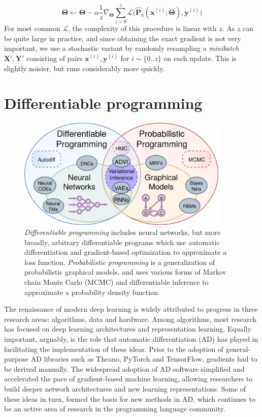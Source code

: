 \documentclass[12pt,initial,twoside,maitrise]{dms}
\numberwithin{equation}{section}
\numberwithin{table}{chapter}
\numberwithin{figure}{chapter}
\begin{document}
%
\begin{equation} \label{eq:stochastic_grad_descent}
    \mathbf\Theta \leftarrow \mathbf\Theta - \alpha\frac{1}{z}\nabla_{\mathbf\Theta} \sum_{i=0}^z\mathcal{L}\big(\mathbf{\hat P}_k(\mathbf{x}^{(i)}; \mathbf{\Theta}), \mathbf{y}^{(i)}\big)
\end{equation}
%
For most common $\mathcal{L}$, the complexity of this procedure is linear with $z$. As $z$ can be quite large in practice, and since obtaining the exact gradient is not very important, we use a stochastic variant by randomly resampling a \textit{minibatch} $\mathbf{X}', \mathbf{Y}'$ consisting of pairs $\mathbf{x}^{(i)}, \mathbf{y}^{(i)}$ for $i \sim \{0..z\}$ on each update. This is slightly noisier, but runs considerably more quickly.

\section{Differentiable programming}\label{sec:differentiable-programming}

\begin{figure}
    \centering
    \includegraphics[width=0.90\textwidth]{diff_prob_prog.png}
    \caption{\textit{Differentiable programming} includes neural networks, but more broadly, arbitrary differentiable programs which use automatic differentiation and gradient-based optimization to approximate a loss function. \textit{Probabilistic programming} is a generalization of probabilistic graphical models, and uses various forms of Markov chain Monte Carlo (MCMC) and differentiable inference to approximate a probability density function.}
    \label{fig:diff_prob_prog}
\end{figure}

The renaissance of modern deep learning is widely attributed to progress in three research areas: algorithms, data and hardware. Among algorithms, most research has focused on deep learning architectures and representation learning. Equally important, arguably, is the role that automatic differentiation (AD) has played in facilitating the implementation of these ideas. Prior to the adoption of general-purpose AD libraries such as Theano, PyTorch and TensorFlow, gradients had to be derived manually. The widespread adoption of AD software simplified and accelerated the pace of gradient-based machine learning, allowing researchers to build deeper network architectures and new learning representations. Some of these ideas in turn, formed the basis for new methods in AD, which continues to be an active area of research in the programming language community.
\end{document}
